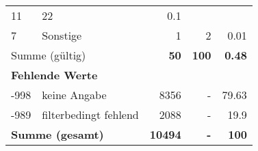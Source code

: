 \begin{longtable}{lXrrr}
       \num{11} &
       \num[round-mode=places,round-precision=2]{22} &
         \num[round-mode=places,round-precision=2]{0.1} \\

     7 &
     \multicolumn{1}{X}{ Sonstige   } &


       \num{1} &
       \num[round-mode=places,round-precision=2]{2} &
         \num[round-mode=places,round-precision=2]{0.01} \\
     \midrule
     \multicolumn{2}{l}{Summe (gültig)} &
       \textbf{\num{50}} &
     \textbf{\num{100}} &
       \textbf{\num[round-mode=places,round-precision=2]{0.48}} \\
     \multicolumn{5}{l}{\textbf{Fehlende Werte}}\\
       -998 &
       keine Angabe &
         \num{8356} &
        - &
         \num[round-mode=places,round-precision=2]{79.63} \\
       -989 &
       filterbedingt fehlend &
         \num{2088} &
        - &
         \num[round-mode=places,round-precision=2]{19.9} \\
     \midrule
     \multicolumn{2}{l}{\textbf{Summe (gesamt)}} &
          \textbf{\num{10494}} &
        \textbf{-} &
        \textbf{\num{100}} \\
     \bottomrule
     \end{longtable}
     
